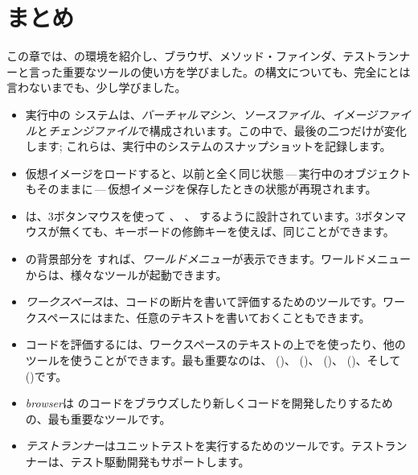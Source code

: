 \documentclass[a4paper,10pt,twoside]{book}
\begin{document}
\section{まとめ}
この章では、\pharo の環境を紹介し、ブラウザ、メソッド・ファインダ、テストランナーと言った重要なツールの使い方を学びました。\pharo の構文についても、完全にとは言わないまでも、少し学びました。

\begin{itemize}
  \item 実行中の \pharo システムは、\emph{バーチャルマシン}、\emph{ソースファイル}、\emph{イメージファイル}と\emph{チェンジファイル}で構成されいます。この中で、最後の二つだけが変化します; これらは、実行中のシステムのスナップショットを記録します。
  \item \pharo 仮想イメージをロードすると、以前と全く同じ状態\,---\,実行中のオブジェクトもそのままに\,---\,仮想イメージを保存したときの状態が再現されます。
  \item \pharo は、3ボタンマウスを使って \click、 \actclick、 \metaclick するように設計されています。3ボタンマウスが無くても、キーボードの修飾キーを使えば、同じことができます。
  \item \pharo の背景部分を \click すれば、\emph{ワールドメニュー}が表示できます。ワールドメニューからは、様々なツールが起動できます。
  \item \emph{ワークスペース}は、コードの断片を書いて評価するためのツールです。ワークスペースにはまた、任意のテキストを書いておくこともできます。
  \item コードを評価するには、ワークスペースのテキストの上でを使ったり、他のツールを使うことができます。最も重要なのは、 ()、 ()、 ()、 ()、そして ()です。
  \item \emph{browser}は \pharo のコードをブラウズしたり新しくコードを開発したりするための、最も重要なツールです。
  \item \emph{テストランナー}はユニットテストを実行するためのツールです。テストランナーは、テスト駆動開発もサポートします。
\end{itemize}

\ifx\wholebook\relax\else 
   
   
\end{document}
